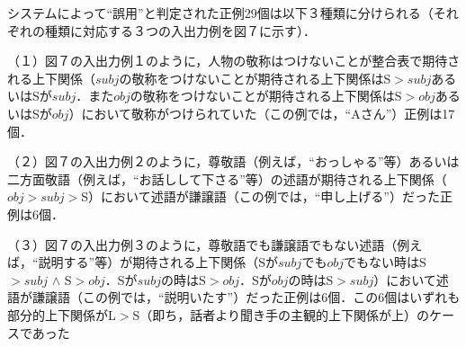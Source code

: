 システムによって``誤用''と判定された正例29個は以下３種類に分けられる（それぞれの種類に対応する３つの入出力例を図７に示す）．


（１）図７の入出力例１のように，人物の敬称はつけないことが整合表で期待される上下関係（$subj$の敬称をつけないことが期待される上下関係はS$>subj$あるいはSが$subj$．また$obj$の敬称をつけないことが期待される上下関係はS$>obj$あるいはSが$obj$）において敬称がつけられていた（この例では，``Aさん''）正例は17個．

（２）図７の入出力例２のように，尊敬語（例えば，``おっしゃる''等）あるいは二方面敬語（例えば，``お話しして下さる''等）の述語が期待される上下関係（$obj>subj>$S）において述語が謙譲語（この例では，``申し上げる''）だった正例は6個．

（３）図７の入出力例３のように，尊敬語でも謙譲語でもない述語（例えば，``説明する''等）が期待される上下関係（Sが$subj$でも$obj$でもない時はS$>subj$ $\wedge$ S$>obj$．Sが$subj$の時はS$>obj$．Sが$obj$の時はS$>subj$）において述語が謙譲語（この例では，``説明いたす''）だった正例は6個．この6個はいずれも部分的上下関係がL$>$S（即ち，話者より聞き手の主観的上下関係が上）のケースであった

